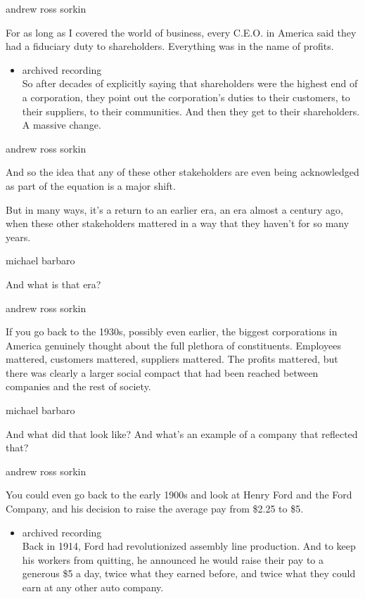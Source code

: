 andrew ross sorkin

For as long as I covered the world of business, every C.E.O. in America
said they had a fiduciary duty to shareholders. Everything was in the
name of profits.

\begin{itemize}
\tightlist
\item
  archived recording\\
  So after decades of explicitly saying that shareholders were the
  highest end of a corporation, they point out the corporation's duties
  to their customers, to their suppliers, to their communities. And then
  they get to their shareholders. A massive change.
\end{itemize}

andrew ross sorkin

And so the idea that any of these other stakeholders are even being
acknowledged as part of the equation is a major shift.

But in many ways, it's a return to an earlier era, an era almost a
century ago, when these other stakeholders mattered in a way that they
haven't for so many years.

michael barbaro

And what is that era?

andrew ross sorkin

If you go back to the 1930s, possibly even earlier, the biggest
corporations in America genuinely thought about the full plethora of
constituents. Employees mattered, customers mattered, suppliers
mattered. The profits mattered, but there was clearly a larger social
compact that had been reached between companies and the rest of society.

michael barbaro

And what did that look like? And what's an example of a company that
reflected that?

andrew ross sorkin

You could even go back to the early 1900s and look at Henry Ford and the
Ford Company, and his decision to raise the average pay from \$2.25 to
\$5.

\begin{itemize}
\tightlist
\item
  archived recording\\
  Back in 1914, Ford had revolutionized assembly line production. And to
  keep his workers from quitting, he announced he would raise their pay
  to a generous \$5 a day, twice what they earned before, and twice what
  they could earn at any other auto company.
\end{itemize}

